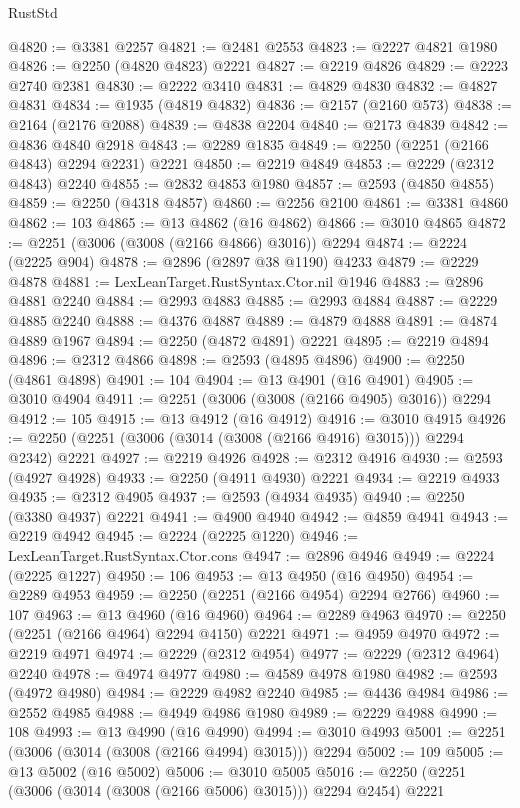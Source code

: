 \begin{lexlean}{RustStd}
\begin{coremodule}
{\begin{coremodule}
{{{{{{{{{{{{{{{{{{{{{{{{{{{{{{{{{{{{{{{{{{{{{{{{{{{{{@4820 := @3381 @2257
@4821 := @2481 @2553
@4823 := @2227 @4821 @1980
@4826 := @2250 (@4820 @4823) @2221
@4827 := @2219 @4826
@4829 := @2223 @2740 @2381
@4830 := @2222 @3410
@4831 := @4829 @4830
@4832 := @4827 @4831
@4834 := @1935 (@4819 @4832)
@4836 := @2157 (@2160 @573)
@4838 := @2164 (@2176 @2088)
@4839 := @4838 @2204
@4840 := @2173 @4839
@4842 := @4836 @4840 @2918
@4843 := @2289 @1835
@4849 := @2250 (@2251 (@2166 @4843) @2294 @2231) @2221
@4850 := @2219 @4849
@4853 := @2229 (@2312 @4843) @2240
@4855 := @2832 @4853 @1980
@4857 := @2593 (@4850 @4855)
@4859 := @2250 (@4318 @4857)
@4860 := @2256 @2100
@4861 := @3381 @4860
@4862 := 103
@4865 := @13 @4862 (@16 @4862)
@4866 := @3010 @4865
@4872 := @2251 (@3006 (@3008 (@2166 @4866) @3016)) @2294
@4874 := @2224 (@2225 @904)
@4878 := @2896 (@2897 @38 @1190) @4233
@4879 := @2229 @4878
@4881 := LexLeanTarget.RustSyntax.Ctor.nil @1946
@4883 := @2896 @4881 @2240
@4884 := @2993 @4883
@4885 := @2993 @4884
@4887 := @2229 @4885 @2240
@4888 := @4376 @4887
@4889 := @4879 @4888
@4891 := @4874 @4889 @1967
@4894 := @2250 (@4872 @4891) @2221
@4895 := @2219 @4894
@4896 := @2312 @4866
@4898 := @2593 (@4895 @4896)
@4900 := @2250 (@4861 @4898)
@4901 := 104
@4904 := @13 @4901 (@16 @4901)
@4905 := @3010 @4904
@4911 := @2251 (@3006 (@3008 (@2166 @4905) @3016)) @2294
@4912 := 105
@4915 := @13 @4912 (@16 @4912)
@4916 := @3010 @4915
@4926 := @2250 (@2251 (@3006 (@3014 (@3008 (@2166 @4916) @3015))) @2294 @2342) @2221
@4927 := @2219 @4926
@4928 := @2312 @4916
@4930 := @2593 (@4927 @4928)
@4933 := @2250 (@4911 @4930) @2221
@4934 := @2219 @4933
@4935 := @2312 @4905
@4937 := @2593 (@4934 @4935)
@4940 := @2250 (@3380 @4937) @2221
@4941 := @4900 @4940
@4942 := @4859 @4941
@4943 := @2219 @4942
@4945 := @2224 (@2225 @1220)
@4946 := LexLeanTarget.RustSyntax.Ctor.cons
@4947 := @2896 @4946
@4949 := @2224 (@2225 @1227)
@4950 := 106
@4953 := @13 @4950 (@16 @4950)
@4954 := @2289 @4953
@4959 := @2250 (@2251 (@2166 @4954) @2294 @2766)
@4960 := 107
@4963 := @13 @4960 (@16 @4960)
@4964 := @2289 @4963
@4970 := @2250 (@2251 (@2166 @4964) @2294 @4150) @2221
@4971 := @4959 @4970
@4972 := @2219 @4971
@4974 := @2229 (@2312 @4954)
@4977 := @2229 (@2312 @4964) @2240
@4978 := @4974 @4977
@4980 := @4589 @4978 @1980
@4982 := @2593 (@4972 @4980)
@4984 := @2229 @4982 @2240
@4985 := @4436 @4984
@4986 := @2552 @4985
@4988 := @4949 @4986 @1980
@4989 := @2229 @4988
@4990 := 108
@4993 := @13 @4990 (@16 @4990)
@4994 := @3010 @4993
@5001 := @2251 (@3006 (@3014 (@3008 (@2166 @4994) @3015))) @2294
@5002 := 109
@5005 := @13 @5002 (@16 @5002)
@5006 := @3010 @5005
@5016 := @2250 (@2251 (@3006 (@3014 (@3008 (@2166 @5006) @3015))) @2294 @2454) @2221
}}}}}}}}}}}}}}}}}}}}}}}}}}}}}}}}}}}}}}}}}}}}}}}}}}}}}
\end{coremodule}}
\end{coremodule}
\end{lexlean}
